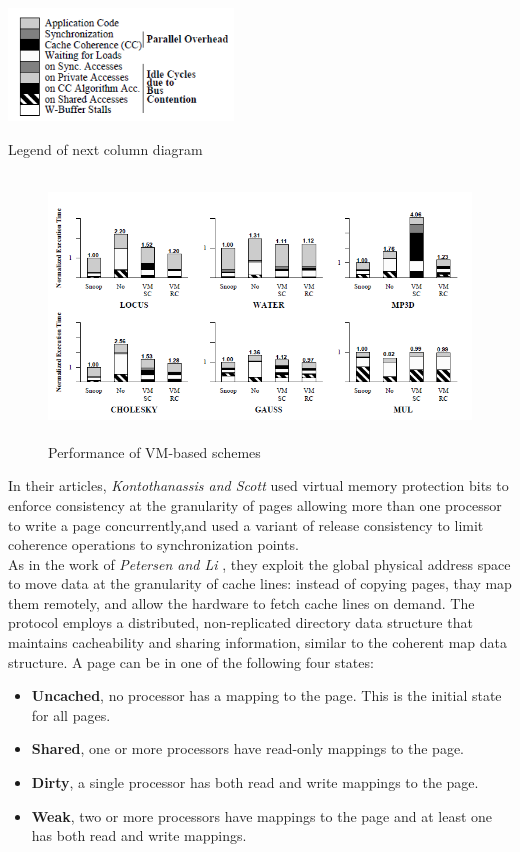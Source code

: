 \documentclass[a4paper,10pt]{article}
\makeatletter
\newenvironment{figurehere}{\def\@captype{figure}\vspace{2ex}}{\vspace{2ex}}
\makeatother
\begin{document}
\begin{multicols}{2}
\begin{figurehere}
 \centering
 \includegraphics[width=6cm, height=3cm]{./eps/Legenda_VM-based.PNG}
 \caption{Legend of next column diagram}
 \label{fig:legend}
\end{figurehere}

\begin{figure}
 \centering
 \includegraphics[width=14cm, height=7cm]{./eps/result1.PNG}
 \caption{Performance of VM-based schemes}
 \label{fig:result1}
\end{figure}

\parindent 10mm In their articles,\emph{ Kontothanassis and Scott} \cite{Kontothanassis94softwarecache} used virtual memory protection bits to enforce consistency at the granularity of pages allowing more than one processor to write a page concurrently,and used a variant of release consistency to limit coherence operations to synchronization points.\\
As in the work of \emph{Petersen and Li} \cite{Li95multiprocessorcache}, they exploit the global physical address space to move data at the granularity of cache lines: instead of copying pages, thay  map them remotely, and allow the hardware to fetch cache lines on demand. The protocol employs a distributed, non-replicated directory data structure that maintains cacheability and sharing information, similar to the coherent map data structure. A page can be in one of the following four states:
\begin{itemize}
    \item \textbf{Uncached}, no processor has a mapping to the page. This
is the initial state for all pages.
    \item \textbf{Shared}, one or more processors have read-only mappings
to the page.
   \item \textbf{Dirty}, a single processor has both read and write mappings
to the page.
   \item \textbf{Weak},  two or more processors have mappings to the page
and at least one has both read and write mappings.
\end{itemize}


\end{multicols}
\end{document}
